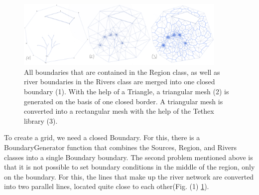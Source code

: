\documentclass[]{pracamgr}
\begin{document}
      \begin{figure}[H]
        \centering
        \includegraphics[width=0.9\textwidth]{figs/mesh_generation.png}        
        \caption{All boundaries that are contained in the Region class, as well as river boundaries in the Rivers class are merged into one closed boundary (1). With the help of a Triangle, a triangular mesh (2) is generated on the basis of one closed border. A triangular mesh is converted into a rectangular mesh with the help of the Tethex library (3).}
        \label{mesh_generation}
      \end{figure}

      To create a grid, we need a closed Boundary. For this, there is a BoundaryGenerator function that combines the Sources, Region, and Rivers classes into a single Boundary boundary. The second problem mentioned above is that it is not possible to set boundary conditions in the middle of the region, only on the boundary. For this, the lines that make up the river network are converted into two parallel lines, located quite close to each other(Fig. (1) \ref{mesh_generation}).
\end{document}
